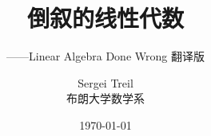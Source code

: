 \documentclass[openany,twoside,zihao=-4,,fontset=windows]{zhbook}
\title{倒叙的线性代数}  %
\subtitle{——Linear Algebra
Done Wrong 翻译版}  %
\author{Sergei Treil\\ 布朗大学数学系 }  %
\date{\today}  %
\begin{document}
\maketitle

%



\frontmatter





%


%


\maketoc




% 



\mainmatter







% 


% 


% 


% 


% 


% 


% 


% 




% 
\end{document}
